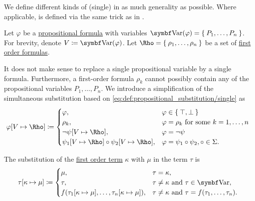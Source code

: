 \begin{definition}\label{def:first_order_substitution}
  We define different kinds of (single)  in as much generality as possible. Where applicable,  is defined via the same trick as in .

  \begin{DefEnum}
     Let \( \varphi \) be a \hyperref[def:propositional_language/formula]{propositional formula} with variables \( \Bold{Var}(\varphi) = \Set{ P_1, \ldots, P_n } \). For brevity, denote \( V \coloneqq \Bold{Var}(\varphi) \). Let \( \Rho = \Set{ \rho_1, \ldots, \rho_n } \) be a set of \hyperref[def:first_order_language/formula]{first order formulas}.

    It does not make sense to replace a single propositional variable by a single formula. Furthermore, a first-order formula \( \rho_k \) cannot possibly contain any of the propositional variables \( P_1, \ldots, P_n \). We introduce a simplification of the simultaneous substitution based on \eqref{eq:def:propositional_substitution/single} as
    \begin{equation}\label{eq:def:first_order_substitution/predicate}
      \varphi[V \mapsto \Rho] \coloneqq \begin{cases}
        \varphi,                                             &\varphi \in \Set{ \top, \bot } \\
        \rho_k,                                              &\varphi = \rho_k \T{for some} k = 1, \ldots, n \\
        \neg \psi[V \mapsto \Rho],                           &\varphi = \neg \psi \\
        \psi_1[V \mapsto \Rho] \circ \psi_2[V \mapsto \Rho], &\varphi = \psi_1 \circ \psi_2, \circ \in \Sigma.
      \end{cases}
    \end{equation}

     The substitution of the \hyperref[def:first_order_language/term]{first order term} \( \kappa \) with \( \mu \) in the term \( \tau \) is
    \begin{equation}\label{eq:def:first_order_substitution/term_in_term}
      \tau[\kappa \mapsto \mu] \coloneqq \begin{cases}
        \mu,                                                               &\tau = \kappa, \\
        \tau,                                                              &\tau \neq \kappa \T{and} \tau \in \Bold{Var}, \\
        f(\tau_1[\kappa \mapsto \mu], \ldots, \tau_n[\kappa \mapsto \mu]), &\tau \neq \kappa \T{and} \tau = f(\tau_1, \ldots, \tau_n).
      \end{cases}
    \end{equation}


\end{DefEnum}
\end{definition}
